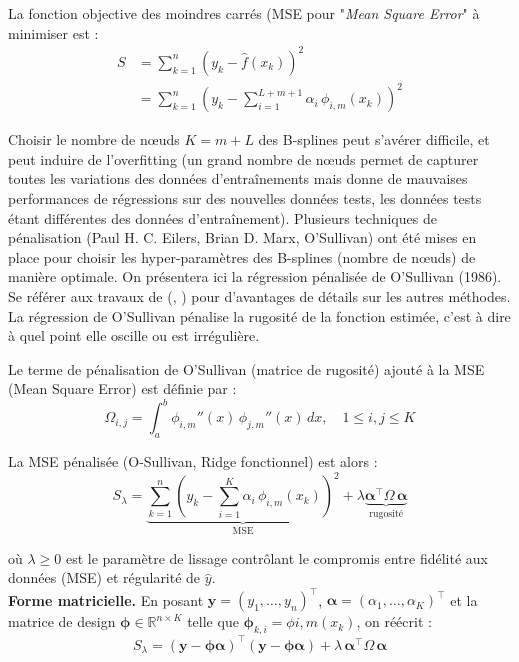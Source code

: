 \documentclass{article}
\begin{document}
	La fonction objective des moindres carrés (MSE pour "\textit{Mean Square Error}" à minimiser est :
	\begin{align}
		S &= \sum_{k=1}^{n} \left(y_k - \hat{f}(x_k)\right)^{2} \\
		&= \sum_{k=1}^{n} \left(y_k - \sum_{i=1}^{L+m+1} 
		\alpha_i\, \phi_{i,m}(x_k)\right)^{2}
	\end{align}
	
	Choisir le nombre de nœuds $K = m+L$ des B-splines peut s'avérer difficile, et peut induire de l'overfitting (un grand nombre de nœuds permet de capturer toutes les variations des données d'entraînements mais donne de mauvaises performances de régressions sur des nouvelles données tests, les données tests étant différentes des données d'entraînement). Plusieurs techniques de pénalisation (Paul H. C. Eilers, Brian D. Marx, O'Sullivan) ont été mises en place pour choisir les hyper-paramètres des B-splines (nombre de nœuds) de manière optimale. On présentera ici la régression pénalisée de O'Sullivan (1986). Se référer aux travaux de (\cite{wand2008}, \cite{eilers1996}) pour d'avantages de détails sur les autres méthodes.\\
	
	La régression de O'Sullivan pénalise la rugosité de la fonction estimée, c'est à dire à quel point elle oscille ou est irrégulière.
	
	Le terme de pénalisation de O'Sullivan (matrice de rugosité) ajouté à la MSE (Mean Square Error) est définie par :
	\begin{equation}
		\Omega_{i,j} = \int_{a}^{b} \phi_{i,m}''(x)\, \phi_{j,m}''(x)\, dx, 
		\quad 1 \leq i, j \leq K
	\end{equation}
	
	La MSE pénalisée (O-Sullivan, Ridge fonctionnel) est alors :
	\begin{equation}
		S_\lambda = \underbrace{\sum_{k=1}^{n} \left(y_k - \sum_{i=1}^{K} 
			\alpha_i\, \phi_{i,m}(x_k)\right)^{2}}_{\text{MSE}} 
		+ \lambda \underbrace{\boldsymbol{\alpha}^\top \Omega\, 
			\boldsymbol{\alpha}}_{\text{rugosité}}
	\end{equation}
	
	où $\lambda \geq 0$ est le paramètre de lissage contrôlant le compromis entre 
	fidélité aux données (MSE) et régularité de $\hat y$.\\
	
	\textbf{Forme matricielle.} En posant $\mathbf{y} = (y_1, \ldots, y_n)^\top$, 
	$\boldsymbol{\alpha} = (\alpha_1, \ldots, \alpha_K)^\top$ et la matrice de design 
	$\mathbf{\phi} \in \mathbb{R}^{n \times K}$ telle que $\mathbf{\phi}_{k,i} = \phi{i, m}(x_k)$, 
	on réécrit :
	\begin{equation}
		S_\lambda = \left(\mathbf{y} - \mathbf{\phi}\boldsymbol{\alpha}\right)^\top 
		\left(\mathbf{y} - \mathbf{\phi}\boldsymbol{\alpha}\right) 
		+ \lambda\, \boldsymbol{\alpha}^\top \Omega\, \boldsymbol{\alpha}
	\end{equation}
	
\end{document}
